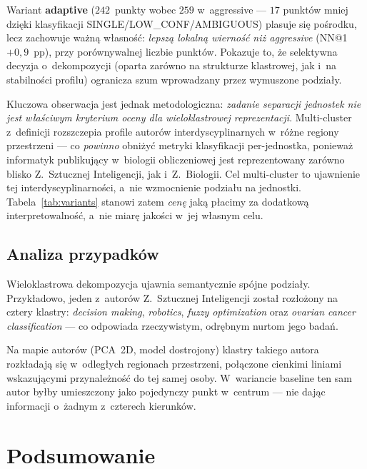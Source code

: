 \documentclass[a4paper,11pt,twocolumn]{article}
\begin{document}
Wariant \textbf{adaptive} ($242$~punkty wobec $259$ w~aggressive ---
$17$ punktów mniej dzięki klasyfikacji SINGLE/LOW\_CONF/AMBIGUOUS)
plasuje się pośrodku, lecz zachowuje ważną własność: \emph{lepszą
lokalną wierność niż aggressive} (NN@1 $+0{,}9$~pp), przy
porównywalnej liczbie punktów. Pokazuje to, że selektywna decyzja
o~dekompozycji (oparta zarówno na strukturze klastrowej, jak i~na
stabilności profilu) ogranicza szum wprowadzany przez wymuszone
podziały.

Kluczowa obserwacja jest jednak metodologiczna: \emph{zadanie
separacji jednostek nie jest właściwym kryterium oceny dla
wieloklastrowej reprezentacji}. Multi-cluster z~definicji rozszczepia
profile autorów interdyscyplinarnych w~różne regiony przestrzeni ---
co \emph{powinno} obniżyć metryki klasyfikacji per-jednostka, ponieważ
informatyk publikujący w~biologii obliczeniowej jest reprezentowany
zarówno blisko Z.~Sztucznej Inteligencji, jak i~Z.~Biologii. Cel
multi-cluster to ujawnienie tej interdyscyplinarności, a~nie
wzmocnienie podziału na jednostki. Tabela~\ref{tab:variants} stanowi
zatem \emph{cenę} jaką płacimy za dodatkową interpretowalność, a~nie
miarę jakości w~jej własnym celu.


\subsection{Analiza przypadków}

Wieloklastrowa dekompozycja ujawnia semantycznie spójne podziały.
Przykładowo, jeden z~autorów Z.~Sztucznej Inteligencji został
rozłożony na cztery klastry: \emph{decision making}, \emph{robotics},
\emph{fuzzy optimization} oraz \emph{ovarian cancer classification}
--- co odpowiada rzeczywistym, odrębnym nurtom jego badań.

Na mapie autorów (PCA~2D, model dostrojony) klastry takiego autora
rozkładają się w~odległych regionach przestrzeni, połączone cienkimi
liniami wskazującymi przynależność do tej samej osoby. W~wariancie
baseline ten sam autor byłby umieszczony jako pojedynczy punkt
w~centrum --- nie dając informacji o~żadnym z~czterech kierunków.


\section{Podsumowanie}
\label{sec:concl}
\end{document}
